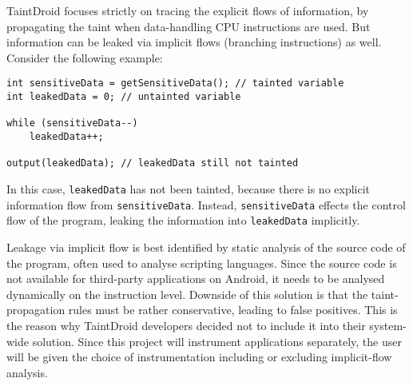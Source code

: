 \documentclass[12pt]{article}
\begin{document}
TaintDroid focuses strictly on tracing the explicit flows of information, 
by propagating the taint when data-handling CPU instructions are used. 
But information can be leaked via implicit flows (branching instructions) 
as well. Consider the following example:

\begin{verbatim}
int sensitiveData = getSensitiveData(); // tainted variable
int leakedData = 0; // untainted variable

while (sensitiveData--)
    leakedData++;

output(leakedData); // leakedData still not tainted
\end{verbatim}

In this case, \verb|leakedData| has not been tainted, because there is 
no explicit information flow from \verb|sensitiveData|. Instead, 
\verb|sensitiveData| effects the control flow of the program, leaking
the information into \verb|leakedData| implicitly. 

Leakage via implicit flow is best identified by static analysis of the 
source code of the program, often used to analyse scripting languages. 
Since the source code is not available for third-party applications on 
Android, it needs to be analysed dynamically on the instruction level.
Downside of this solution is that the taint-propagation rules must be
rather conservative, leading to false positives. This is the reason why
TaintDroid developers decided not to include it into their system-wide
solution. Since this project will instrument applications separately, 
the user will be given the choice of instrumentation including or 
excluding implicit-flow analysis.

%
\end{document}
